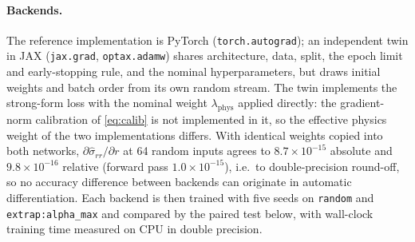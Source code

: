 \paragraph{Backends.}
The reference implementation is PyTorch (\texttt{torch.autograd}); an independent
twin in JAX (\texttt{jax.grad}, \texttt{optax.adamw}) shares architecture, data,
split, the epoch limit and early-stopping rule, and the nominal hyperparameters,
but draws initial weights and batch order from its own random stream.
The twin implements the strong-form loss with the nominal weight
$\lambda_{\mathrm{phys}}$ applied directly: the gradient-norm calibration of
\eqref{eq:calib} is not implemented in it, so the effective physics weight of the
two implementations differs.
With identical weights copied into both networks, $\partial\hat\sigma_{rr}/\partial r$
at 64 random inputs agrees to $8.7\times10^{-15}$ absolute and $9.8\times10^{-16}$
relative (forward pass $1.0\times10^{-15}$), i.e.\ to double-precision round-off,
so no accuracy difference between backends can originate in automatic
differentiation.
Each backend is then trained with five seeds on \texttt{random} and
\texttt{extrap:alpha\_max} and compared by the paired test below, with wall-clock
training time measured on CPU in double precision.
